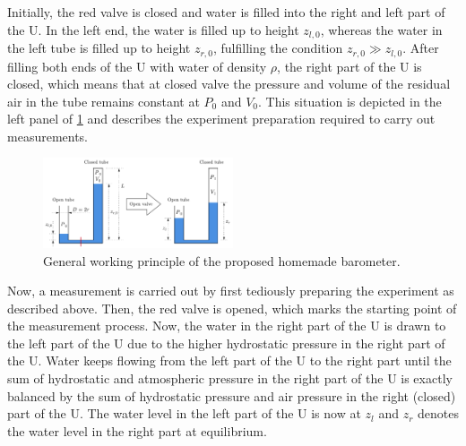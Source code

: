 \documentclass[a4paper,10pt, twocolumn]{article}
\begin{document}
Initially, the red valve is closed and water is filled into the right and left part of the U. In the left end, the water is filled up to height $z_{l,0}$, whereas the water in the left tube is filled up to height $z_{r,0}$, fulfilling the condition $z_{r,0} \gg z_{l,0}$. After filling both ends of the U with water of density $\rho$, the right part of the U is closed, which means that at closed valve the pressure and volume of the residual air in the tube remains constant at $P_0$ and $V_0$. This situation is depicted in the left panel of \cref{fig:barometer_principle} and describes the experiment preparation required to carry out measurements.
\begin{figure}[h]
	\centering
	\includegraphics[width=0.5\textwidth]{figures/barometer_principle.pdf}
	\caption{General working principle of the proposed homemade barometer.}
	\label{fig:barometer_principle}
\end{figure}

Now, a measurement is carried out by first tediously preparing the experiment as described above. Then, the red valve is opened, which marks the starting point of the measurement process. Now, the water in the right part of the U is drawn to the left part of the U due to the higher hydrostatic pressure in the right part of the U. Water keeps flowing from the left part of the U to the right part until the sum of hydrostatic and atmospheric pressure in the right part of the U is exactly balanced by the sum of hydrostatic pressure and air pressure in the right (closed) part of the U. The water level in the left part of the U is now at $z_l$ and $z_r$ denotes the water level in the right part at equilibrium.
\end{document}
